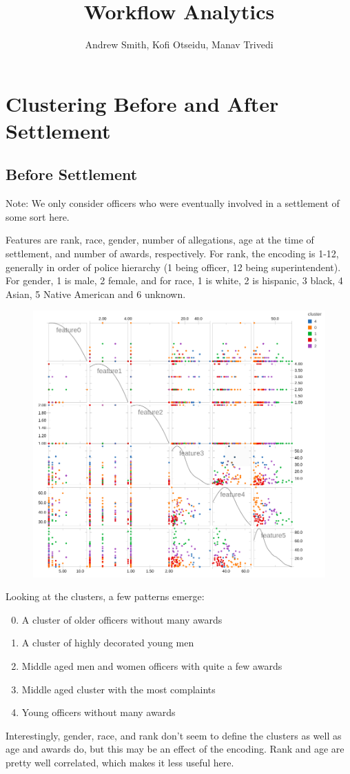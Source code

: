 \documentclass{article}
\title{Workflow Analytics}
\author{Andrew Smith, Kofi Otseidu, Manav Trivedi}
\begin{document}
\maketitle

\section{Clustering Before and After Settlement}
\subsection{Before Settlement}
Note: We only consider officers who were eventually involved in a settlement of some sort here.

Features are rank, race, gender, number of allegations, age at the time of settlement, and number of awards, respectively. For rank, the encoding is 1-12, generally in order of police hierarchy (1 being officer, 12 being superintendent). For gender, 1 is male, 2 female, and for race, 1 is white, 2 is hispanic, 3 black, 4 Asian, 5 Native American and 6 unknown.


\begin{figure}[h!]
\centering
\includegraphics[width=\textwidth]{cluster.png}
\end{figure}
Looking at the clusters, a few patterns emerge:
\begin{enumerate}
\setcounter{enumi}{-1}
\item{A cluster of older officers without many awards}
\item{A cluster of highly decorated young men}
\item{Middle aged men and women officers with quite a few awards}
\item{Middle aged cluster with the most complaints}
\item{Young officers without many awards}
\end{enumerate}
Interestingly, gender, race, and rank don't seem to define the clusters as well as age and awards do, but this may be an effect of the encoding. Rank and age are pretty well correlated, which makes it less useful here.
\end{document}
